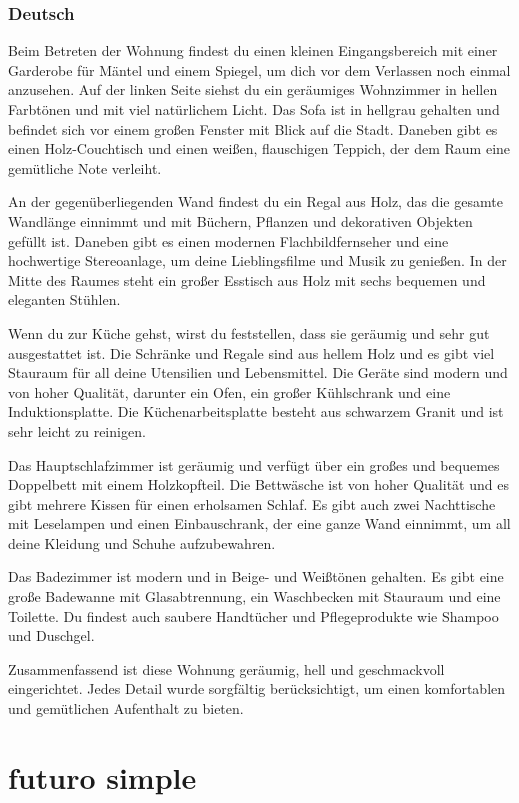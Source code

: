 \documentclass{article}
\begin{document}
\begin{multicols}{2}
\subsubsection{Deutsch}
Beim Betreten der Wohnung findest du einen kleinen Eingangsbereich mit einer
Garderobe für Mäntel und einem Spiegel, um dich vor dem Verlassen noch einmal
anzusehen. Auf der linken Seite siehst du ein geräumiges Wohnzimmer in hellen
Farbtönen und mit viel natürlichem Licht. Das Sofa ist in hellgrau gehalten und
befindet sich vor einem großen Fenster mit Blick auf die Stadt. Daneben gibt es
einen Holz-Couchtisch und einen weißen, flauschigen Teppich, der dem Raum eine
gemütliche Note verleiht.

An der gegenüberliegenden Wand findest du ein Regal aus Holz, das die gesamte
Wandlänge einnimmt und mit Büchern, Pflanzen und dekorativen Objekten gefüllt
ist. Daneben gibt es einen modernen Flachbildfernseher und eine hochwertige
Stereoanlage, um deine Lieblingsfilme und Musik zu genießen. In der Mitte des
Raumes steht ein großer Esstisch aus Holz mit sechs bequemen und eleganten
Stühlen.

Wenn du zur Küche gehst, wirst du feststellen, dass sie geräumig und sehr gut
ausgestattet ist. Die Schränke und Regale sind aus hellem Holz und es gibt viel
Stauraum für all deine Utensilien und Lebensmittel. Die Geräte sind modern und
von hoher Qualität, darunter ein Ofen, ein großer Kühlschrank und eine
Induktionsplatte. Die Küchenarbeitsplatte besteht aus schwarzem Granit und ist
sehr leicht zu reinigen.

Das Hauptschlafzimmer ist geräumig und verfügt über ein großes und bequemes
Doppelbett mit einem Holzkopfteil. Die Bettwäsche ist von hoher Qualität und es
gibt mehrere Kissen für einen erholsamen Schlaf. Es gibt auch zwei Nachttische
mit Leselampen und einen Einbauschrank, der eine ganze Wand einnimmt, um all
deine Kleidung und Schuhe aufzubewahren.

Das Badezimmer ist modern und in Beige- und Weißtönen gehalten. Es gibt eine
große Badewanne mit Glasabtrennung, ein Waschbecken mit Stauraum und eine
Toilette. Du findest auch saubere Handtücher und Pflegeprodukte wie Shampoo und
Duschgel.

Zusammenfassend ist diese Wohnung geräumig, hell und geschmackvoll
eingerichtet. Jedes Detail wurde sorgfältig berücksichtigt, um einen
komfortablen und gemütlichen Aufenthalt zu bieten.
\end{multicols}

\section{futuro simple}
\end{document}
